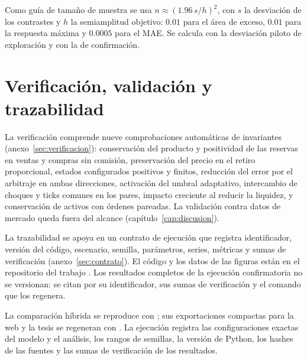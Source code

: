 Como guía de tamaño de muestra se usa $n\approx(1.96\,s/h)^2$, con $s$ la desviación de los contrastes y $h$ la semiamplitud objetivo: $0.01$ para el área de exceso, $0.01$ para la respuesta máxima y $0.0005$ para el MAE. Se calcula con la desviación piloto de exploración y con la de confirmación.

\section{Verificación, validación y trazabilidad}

La verificación comprende nueve comprobaciones automáticas de invariantes (anexo~\ref{sec:verificacion}): conservación del producto y positividad de las reservas en ventas y compras sin comisión, preservación del precio en el retiro proporcional, estados configurados positivos y finitos, reducción del error por el arbitraje en ambas direcciones, activación del umbral adaptativo, intercambio de choques y ticks comunes en los pares, impacto creciente al reducir la liquidez, y conservación de activos con órdenes pareadas. La validación contra datos de mercado queda fuera del alcance (capítulo~\ref{cap:discusion}).

La trazabilidad se apoya en un contrato de ejecución que registra identificador, versión del código, escenario, semilla, parámetros, series, métricas y sumas de verificación (anexo~\ref{sec:contrato}). El código y los datos de las figuras están en el repositorio del trabajo \cite{calderon2026repository}. Los resultados completos de la ejecución confirmatoria no se versionan: se citan por su identificador, sus sumas de verificación y el comando que los regenera.

La comparación híbrida se reproduce con ; sus exportaciones compactas para la web y la tesis se regeneran con . La ejecución \code{\HybridRunID} registra las configuraciones exactas del modelo y el análisis, los rangos de semillas, la versión de Python, los hashes de las fuentes y las sumas de verificación de los resultados.
